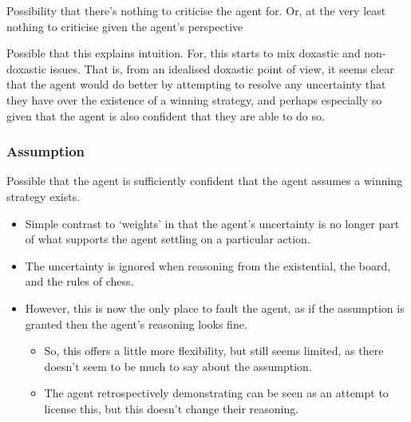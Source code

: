 \documentclass[10pt]{article}
\newcommand{\hozlinedash}[0]{%
  \noindent\hdashrule[0.5ex][c]{\textwidth}{.1pt}{2.5pt}
}
\begin{document}
Possibility that there's nothing to criticise the agent for.
Or, at the very least nothing to criticise given the agent's perspective

\hozlinedash

Possible that this explains intuition.
For, this starts to mix doxastic and non-doxastic issues.
That is, from an idealised doxastic point of view, it seems clear that the agent would do better by attempting to resolve any uncertainty that they have over the existence of a winning strategy, and perhaps especially so given that the agent is also confident that they are able to do so.







\subsubsection{Assumption}
\label{sec:assumption}

\begin{note}
  Possible that the agent is sufficiently confident that the agent assumes a winning strategy exists.
  \begin{itemize}
  \item Simple contrast to `weights' in that the agent's uncertainty is no longer part of what supports the agent settling on a particular action.
  \item The uncertainty is ignored when reasoning from the existential, the board, and the rules of chess.
  \item However, this is now the only place to fault the agent, as if the assumption is granted then the agent's reasoning looks fine.
    \begin{itemize}
    \item So, this offers a little more flexibility, but still seems limited, as there doesn't seem to be much to say about the assumption.
    \item The agent retrospectively demonstrating can be seen as an attempt to license this, but this doesn't change their reasoning.
    \end{itemize}
  \end{itemize}
\end{note}
\end{document}
